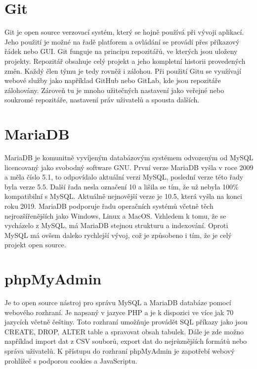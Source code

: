 \section{Git}

Git je open source verzovací systém, který se hojně používá při vývoji
aplikací. Jeho použití je možné na řadě platforem a ovládání
se provádí přes příkazový řádek nebo GUI. Git funguje na principu
repozitářů, ve kterých jsou uloženy projekty. Repozitář obsahuje celý
projekt a jeho kompletní historii provedených změn. Každý člen týmu je
tedy rovněž i zálohou. Při použití Gitu se využívají webové služby
jako například GitHub nebo GitLab, kde jsou repozitáře
zálohovány. Zároveň tu je mnoho užitečných nastavení jako veřejné nebo
soukromé repozitáře, nastavení práv uživatelů a spousta dalších. \cite{git}

\newpage

\section{MariaDB}

MariaDB je komunitně vyvíjeným databázovým systémem odvozeným od MySQL
licencovaný jako svobodný software GNU. První verze MariaDB vyšla v
roce 2009 a měla číslo 5.1, to odpovídalo aktuální verzi MySQL,
poslední verze této řady byla verze 5.5. Další řada nesla označení 10
a lišila se tím, že už nebyla 100\% kompatibilní s MySQL. Aktuálně
nejnovější verze je 10.5, která vyšla na konci roku 2019. MariaDB
podporuje řadu operačních systémů včetně těch nejrozšířenějších jako
Windows, Linux a MacOS. Vzhledem k tomu, že se vycházelo z MySQL, má
MariaDB stejnou strukturu a indexování. Oproti MySQL má ovšem daleko
rychlejší vývoj, což je způsobeno i tím, že je celý projekt open
source. \cite{mariadb}

\section{phpMyAdmin}

Je to open source nástroj pro správu MySQL a MariaDB databáze pomocí
webového rozhraní. Je napsaný v jazyce PHP a je k dispozici ve více jak 70
jazycích včetně češtiny. Toto rozhraní umožňuje provádět SQL příkazy
jako jsou CREATE, DROP, ALTER table a spravovat obsah tabulek. Dále je
zde možno například import dat z CSV souborů, export dat do
nejrůznějších formátů nebo správa uživatelů. K přístupu do rozhraní
phpMyAdmin je zapotřebí webový prohlížeč s podporou cookies a
JavaScriptu. \cite{phpmyadmin} \cite{phpmyadmin-2}






